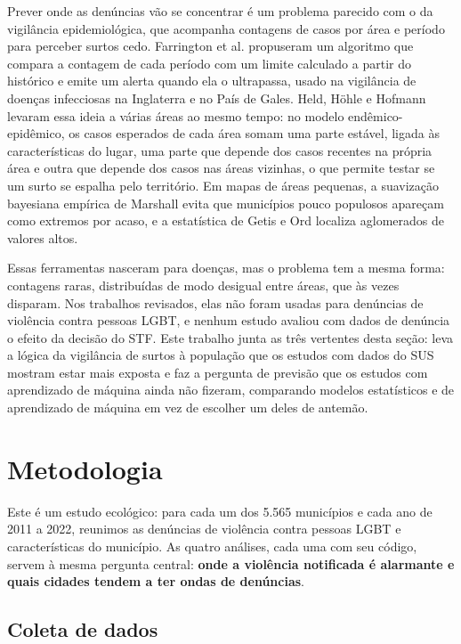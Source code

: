 \documentclass[12pt]{article}
\begin{document}
Prever onde as denúncias vão se concentrar é um problema parecido com o da vigilância epidemiológica, que acompanha contagens de casos por área e período para perceber surtos cedo. Farrington et al. \cite{farrington:1996} propuseram um algoritmo que compara a contagem de cada período com um limite calculado a partir do histórico e emite um alerta quando ela o ultrapassa, usado na vigilância de doenças infecciosas na Inglaterra e no País de Gales. Held, Höhle e Hofmann \cite{held_hohle_hofmann:2005} levaram essa ideia a várias áreas ao mesmo tempo: no modelo endêmico-epidêmico, os casos esperados de cada área somam uma parte estável, ligada às características do lugar, uma parte que depende dos casos recentes na própria área e outra que depende dos casos nas áreas vizinhas, o que permite testar se um surto se espalha pelo território. Em mapas de áreas pequenas, a suavização bayesiana empírica de Marshall \cite{marshall:1991} evita que municípios pouco populosos apareçam como extremos por acaso, e a estatística de Getis e Ord \cite{getis_ord:1992} localiza aglomerados de valores altos.

Essas ferramentas nasceram para doenças, mas o problema tem a mesma forma: contagens raras, distribuídas de modo desigual entre áreas, que às vezes disparam. Nos trabalhos revisados, elas não foram usadas para denúncias de violência contra pessoas LGBT, e nenhum estudo avaliou com dados de denúncia o efeito da decisão do STF. Este trabalho junta as três vertentes desta seção: leva a lógica da vigilância de surtos à população que os estudos com dados do SUS mostram estar mais exposta e faz a pergunta de previsão que os estudos com aprendizado de máquina ainda não fizeram, comparando modelos estatísticos e de aprendizado de máquina em vez de escolher um deles de antemão.


\clearpage
\section{Metodologia}
\label{sec:metodologia}

Este é um estudo ecológico: para cada um dos 5.565 municípios e cada ano de 2011 a 2022, reunimos as denúncias de violência contra pessoas LGBT e características do município. As quatro análises, cada uma com seu código, servem à mesma pergunta central: \textbf{onde a violência notificada é alarmante e quais cidades tendem a ter ondas de denúncias}.

\subsection{Coleta de dados}
\end{document}
